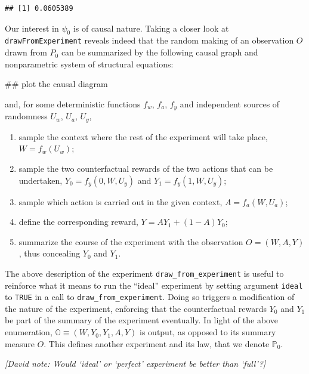 \documentclass[]{article}
\newenvironment{Shaded}{\begin{snugshade}}{\end{snugshade}}
\newcommand{\NormalTok}[1]{#1}
\newcommand{\bbO}{\mathbb{O}}
\newcommand{\bbP}{\mathbb{P}}
\theoremstyle{definition}
\theoremstyle{definition}
\theoremstyle{definition}
\theoremstyle{remark}
\begin{document}
\begin{verbatim}
## [1] 0.0605389
\end{verbatim}

Our interest in \(\psi_{0}\) is of causal nature. Taking a closer look
at \texttt{drawFromExperiment} reveals indeed that the random making of
an observation \(O\) drawn from \(P_{0}\) can be summarized by the
following causal graph and nonparametric system of structural equations:

\begin{Shaded}
\begin{Highlighting}[]
\NormalTok{## plot the causal diagram}
\end{Highlighting}
\end{Shaded}

and, for some deterministic functions \(f_w\), \(f_a\), \(f_y\) and
independent sources of randomness \(U_w\), \(U_a\), \(U_y\),

\begin{enumerate}
\item sample  the context where the  rest of the experiment
  will take place, $W = f_{w}(U_w)$;
\item  sample the  two counterfactual  rewards of  the two
  actions  that   can  be   undertaken,  $Y_{0}  =   f_{y}(0,  W,   U_y)$  and
  $Y_{1} = f_{y}(1, W, U_y)$;
\item\label{item:A:equals} sample   which  action is carried
  out in the given context, $A = f_{a} (W, U_a)$;
\item    define        the    corresponding    reward,
  $Y = A Y_{1} + (1-A) Y_{0}$;
\item summarize the course of the experiment  with the observation $O = (W, A,
  Y)$, thus concealing $Y_{0}$ and $Y_{1}$. 
\end{enumerate}

The above description of the experiment \texttt{draw\_from\_experiment}
is useful to reinforce what it means to run the ``ideal'' experiment by
setting argument \texttt{ideal} to \texttt{TRUE} in a call to
\texttt{draw\_from\_experiment}. Doing so triggers a modification of the
nature of the experiment, enforcing that the counterfactual rewards
\(Y_{0}\) and \(Y_{1}\) be part of the summary of the experiment
eventually. In light of the above enumeration,
\(\bbO \equiv (W, Y_{0}, Y_{1}, A, Y)\) is output, as opposed to its
summary measure \(O\). This defines another experiment and its law, that
we denote \(\bbP_{0}\).

\emph{{[}David note: Would `ideal' or `perfect' experiment be better
than `full'?{]}}
\end{document}
